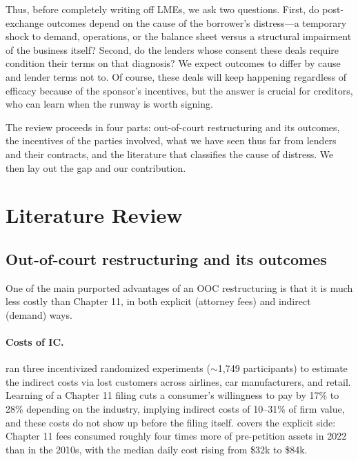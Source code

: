 \documentclass[12pt]{article}
\begin{document}
Thus, before completely writing off LMEs, we ask two questions. First, do post-exchange outcomes depend on the cause of the borrower's distress---a temporary shock to demand, operations, or the balance sheet versus a structural impairment of the business itself? Second, do the lenders whose consent these deals require condition their terms on that diagnosis? We expect outcomes to differ by cause and lender terms not to. Of course, these deals will keep happening regardless of efficacy because of the sponsor's incentives, but the answer is crucial for creditors, who can learn when the runway is worth signing.

The review proceeds in four parts: out-of-court restructuring and its outcomes, the incentives of the parties involved, what we have seen thus far from lenders and their contracts, and the literature that classifies the cause of distress. We then lay out the gap and our contribution.

\section{Literature Review}

\subsection{Out-of-court restructuring and its outcomes}

One of the main purported advantages of an OOC restructuring is that it is much less costly than Chapter 11, in both explicit (attorney fees) and indirect (demand) ways.

\paragraph{Costs of IC.} \citet{antill2026} ran three incentivized randomized experiments ($\sim$1,749 participants) to estimate the indirect costs via lost customers across airlines, car manufacturers, and retail. Learning of a Chapter 11 filing cuts a consumer's willingness to pay by 17\% to 28\% depending on the industry, implying indirect costs of 10--31\% of firm value, and these costs do not show up before the filing itself. \citet{ellias2026} covers the explicit side: Chapter 11 fees consumed roughly four times more of pre-petition assets in 2022 than in the 2010s, with the median daily cost rising from \$32k to \$84k.
\end{document}
